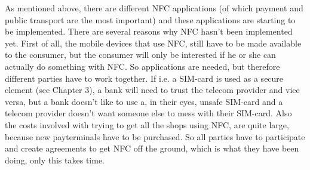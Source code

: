 As mentioned above, there are different NFC applications (of which payment and public transport are the most important) and these applications are starting to be implemented. There are several reasons why NFC hasn't been implemented yet. First of all, the mobile devices that use NFC, still have to be made available to the consumer, but the consumer will only be interested if he or she can actually do something with NFC. So applications are needed, but therefore different parties have to work together. If i.e. a SIM-card is used as a secure element (see Chapter 3), a bank will need to trust the telecom provider and vice versa, but a bank doesn't like to use a, in their eyes, unsafe SIM-card and a telecom provider doesn't want someone else to mess with their SIM-card. Also the costs involved with trying to get all the shops using NFC, are quite large, because new payterminals have to be purchased.
So all parties have to participate and create agreements to get NFC off the ground, which is what they have been doing, only this takes time. %





